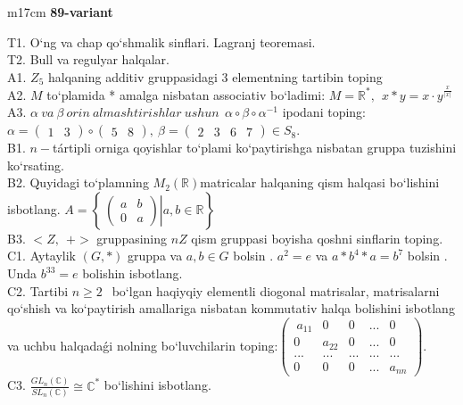 \documentclass{article}
\begin{document}
\begin{tabular}{m{17cm}}
\textbf{89-variant}
\newline

T1. O`ng va chap qo`shmalik sinflari. Lagranj teoremasi. \\
T2. Bull va regulyar halqalar. \\
A1. \(Z_{5}\) halqaning additiv gruppasidagi 3 elementning tartibin toping \\
A2. \(M\) to`plamida * amalga nisbatan associativ bo`ladimi: \(M = \mathbb{R}^{*},\ \ x*y = x \cdot y^{\frac{x}{|x|}}\) \\
A3. \(\alpha\ va\ \beta\ orin\ almashtirishlar\ ushun\ \ \alpha \circ \beta \circ \alpha^{- 1}\) ipodani toping:\(\alpha = \begin{pmatrix}
1 & 3
\end{pmatrix} \circ \begin{pmatrix}
5 & 8
\end{pmatrix},\ \beta = \begin{pmatrix}
2 & 3 & 6 & 7
\end{pmatrix} \in S_{8}\). \\
B1. \(n -\)tártipli orniga qoyishlar to`plami ko`paytirishga nisbatan gruppa tuzishini ko`rsating. \\
B2. Quyidagi to`plamning \(M_{2}(\mathbb{R})\)matricalar halqaning qism halqasi bo`lishini isbotlang. \(A = \left\{ \left. \ \begin{pmatrix}
a & b \\
0 & a
\end{pmatrix} \right|a,b\mathbb{\in R} \right\}\) \\
B3. \(< Z,\ \  + >\) gruppasining \(nZ\) qism gruppasi boyisha qo\textquotesingle shni sinflarin toping. \\
C1. Aytaylik \((G,*)\) gruppa va \(a,b \in G\) bo\textquotesingle lsin . \(a^{2} = e\) va \(a*b^{4}*a = b^{7}\) bo\textquotesingle lsin . Unda \(b^{33} = e\) bolishin isbotlang. \\
C2. Tartibi \(n \geq 2\ \ \) bo`lgan haqiyqiy elementli diogonal matrisalar, matrisalarni qo`shish va ko`paytirish amallariga nisbatan kommutativ halqa bolishini isbotlang va uchbu halqadaǵi nolning bo`luvchilarin toping:\(\begin{pmatrix}
\ a_{11} & 0\ \  & 0 & ... & 0\ \  \\
0\ \  & a_{22} & 0 & ... & 0\ \  \\
... & ... & ... & ... & ... \\
0\ \  & 0\ \  & 0 & ... & a_{nn}
\end{pmatrix}.\) \\
C3. \(\frac{GL_{n}(\mathbb{C})}{SL_{n}(\mathbb{C})} \cong \mathbb{C}^{*}\) bo`lishini isbotlang. \\

\end{tabular}
\vspace{1cm}
\end{document}
